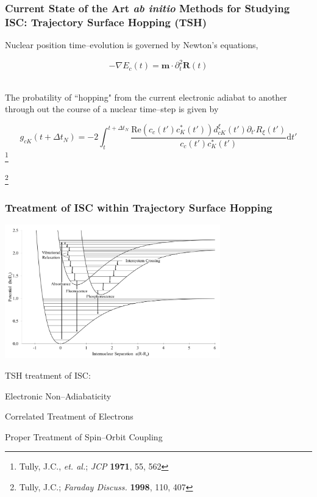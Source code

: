\documentclass[usepdftitle=false,10pt]{beamer}
\newcommand{\cmark}{\color{green} \ding{51}}%
\newcommand{\done}{\rlap{$\square$}{\raisebox{2pt}{\large\hspace{1pt}\cmark}}%
\hspace{-2.5pt}}
\renewcommand{\Re}{\text{Re}}                             %
\newcommand*\vc[1]{\boldsymbol{#1}}
\newcommand\blfootnote[1]{%
  \begingroup
  \renewcommand\thefootnote{}\footnote{#1}%
  \addtocounter{footnote}{-1}%
  \endgroup
}
\begin{document}
\begin{frame}
  \frametitle{Current State of the Art \emph{ab initio} Methods for Studying 
  ISC: Trajectory Surface Hopping (TSH)}

  Nuclear position time--evolution is governed by Newton's equations,

  \begin{equation*}
    -\nabla E_c(t) = \vc{m}\cdot \partial_t^2\vc{R}(t)
  \end{equation*}

  ~\\
  The probatility of ``hopping" from the current electronic adiabat to another
  through out the course of a nuclear time--step is given by

  \begin{equation*}
    g_{cK}(t + \Delta t_N) = -2 \int_t^{t + \Delta t_N} 
      \frac{\Re(c_c(t') c^*_K(t'))d_{cK}^\xi (t') \partial_{t'}
      R_{\xi}(t')}{c_c(t') c^*_K(t')}\mathrm{d}t'
  \end{equation*}
  \blfootnote{\tiny Tully, J.C., \emph{et. al.}; \emph{JCP} \textbf{1971}, 55, 562}
  \blfootnote{\tiny Tully, J.C.; \emph{Faraday Discuss.} \textbf{1998}, 110, 407}
\end{frame}

\begin{frame}
  \frametitle{Treatment of ISC within Trajectory Surface Hopping}
  \begin{center}
  \includegraphics[width=0.7\textwidth]{ISC} 
  \end{center}
  \vspace{-0.5cm}
  TSH treatment of ISC: 
  \begin{mylist}
    \item[\done] Electronic Non--Adiabaticity
    \item Correlated Treatment of Electrons
    \item Proper Treatment of Spin--Orbit Coupling
  \end{mylist}
\end{frame}
\end{document}
